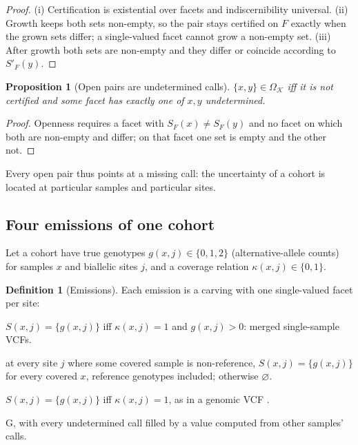 \documentclass[11pt,twocolumn,a4paper]{article}
\theoremstyle{plain}
\newtheorem{proposition}[theorem]{Proposition}
\theoremstyle{definition}
\newtheorem{definition}[theorem]{Definition}
\theoremstyle{remark}
\newcommand{\Kc}{\mathcal{K}}
\newcommand{\Opn}{\Omega}
\begin{document}
\begin{proof}
(i) Certification is existential over facets and indiscernibility universal.
(ii) Growth keeps both sets non-empty, so the pair stays certified on $F$
exactly when the grown sets differ; a single-valued facet cannot grow a
non-empty set. (iii) After growth both sets are non-empty and they differ or
coincide according to $S'_F(y)$.
\end{proof}

\begin{proposition}[Open pairs are undetermined calls]
\label{prop:open}
$\{x,y\}\in\Opn_\Kc$ iff it is not certified and some facet has exactly one of
$x,y$ undetermined.
\end{proposition}

\begin{proof}
Openness requires a facet with $S_F(x)\ne S_F(y)$ and no facet on which both
are non-empty and differ; on that facet one set is empty and the other not.
\end{proof}

Every open pair thus points at a missing call: the uncertainty of a cohort is
located at particular samples and particular sites.

\subsection{Four emissions of one cohort}

Let a cohort have true genotypes $g(x,j)\in\{0,1,2\}$ (alternative-allele
counts) for samples $x$ and biallelic sites $j$, and a coverage relation
$\kappa(x,j)\in\{0,1\}$.

\begin{definition}[Emissions]
\label{def:emissions}
Each emission is a carving with one single-valued facet per site:
\begin{description}[leftmargin=1em,style=nextline]
\item[V (variant-only)] $S(x,j)=\{g(x,j)\}$ iff $\kappa(x,j)=1$ and
  $g(x,j)>0$: merged single-sample VCFs.
\item[J (joint-called)] at every site $j$ where some covered sample is
  non-reference, $S(x,j)=\{g(x,j)\}$ for every covered $x$, reference
  genotypes included; otherwise $\varnothing$.
\item[G (reference blocks)] $S(x,j)=\{g(x,j)\}$ iff $\kappa(x,j)=1$, as in a
  genomic VCF \citep{poplin2018}.
\item[I (imputed)] G, with every undetermined call filled by a value
  computed from other samples' calls.
\end{description}
\end{definition}
\end{document}
